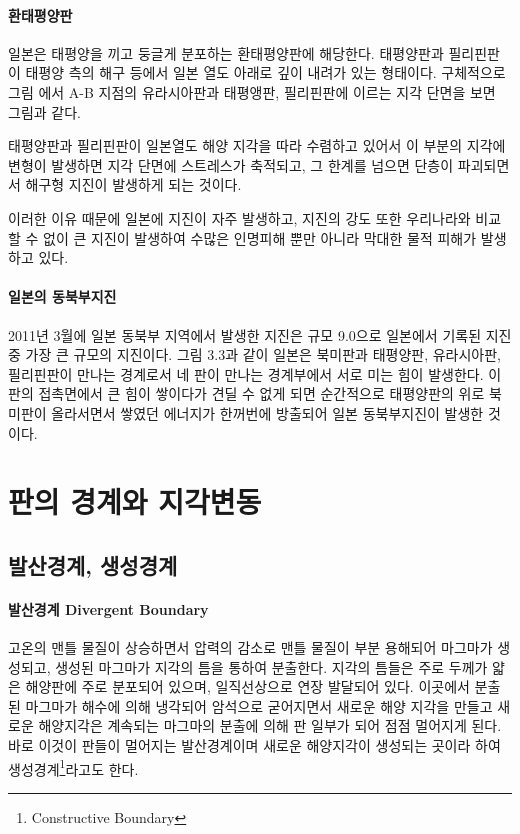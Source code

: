 \documentclass[12pt, a4paper, oneside]{book}
\begin{document}
		\paragraph{환태평양판} 
		일본은 태평양을 끼고 둥글게 분포하는 환태평양판에 해당한다. 
		태평양판과 필리핀판이 태평양 측의 해구 등에서 일본 열도 아래로 깊이 내려가 있는 형태이다.
		구체적으로 그림 에서 A-B 지점의 유라시아판과 태평앵판, 필리핀판에 이르는 지각 단면을 보면 그림과 같다.
		
		태평양판과 필리핀판이 일본열도 해양 지각을 따라 수렴하고 있어서 
		이 부분의 지각에 변형이 발생하면 지각 단면에 스트레스가 축적되고, 그 한계를 넘으면 단층이 파괴되면서 해구형 지진이 발생하게 되는 것이다.
		
		이러한 이유 때문에 일본에 지진이 자주 발생하고, 지진의 강도 또한 우리나라와 비교 할 수 없이 큰 지진이 발생하여 수많은 인명피해 뿐만 아니라 막대한 물적 피해가 발생하고 있다.
		
		
		

	\paragraph{일본의 동북부지진}
		2011년 3월에 일본 동북부 지역에서 발생한 지진은 규모 9.0으로 일본에서 기록된 지진 중 가장 큰 규모의 지진이다.
		그림 3.3과 같이 일본은 북미판과 태평양판, 유라시아판, 필리핀판이 만나는 경계로서 네 판이 만나는 경계부에서 서로 미는 힘이 발생한다. 
		이 판의 접촉면에서 큰 힘이 쌓이다가 견딜 수 없게 되면 순간적으로 태평양판의 위로 북미판이 올라서면서 쌓였던 에너지가 한꺼번에 방출되어 일본 동북부지진이 발생한 것이다.
		


	\clearpage
	\section{판의 경계와 지각변동}
	
	
	\subsection{발산경계, 생성경계}
		\paragraph{발산경계 Divergent Boundary} 
		고온의 맨틀 물질이 상승하면서 압력의 감소로 맨틀 물질이 부분 용해되어 마그마가 생성되고, 생성된 마그마가 지각의 틈을 통하여 분출한다.
		지각의 틈들은 주로 두께가 얇은 해양판에 주로 분포되어 있으며, 일직선상으로 연장 발달되어 있다.
		이곳에서 분출된 마그마가 해수에 의해 냉각되어 암석으로 굳어지면서 새로운 해양 지각을 만들고 새로운 해양지각은 계속되는 마그마의 분출에 의해 판 일부가 되어 점점 멀어지게 된다. 
		바로 이것이 판들이 멀어지는 발산경계이며 새로운 해양지각이 생성되는 곳이라 하여 생성경계\footnote{Constructive Boundary}라고도 한다.
		
\end{document}
